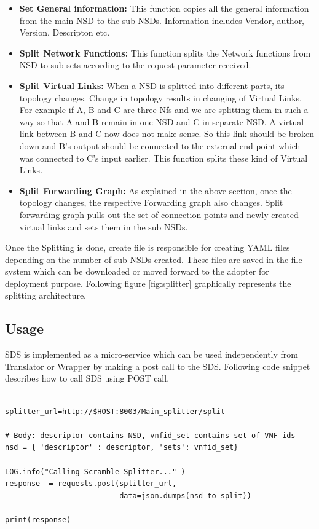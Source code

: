 \begin{itemize}
	\item \textbf{Set General information: }This function copies all the general information from the main NSD to the sub NSDs. Information includes Vendor, author, Version, Descripton etc.
	\item \textbf{Split Network Functions: }This function splits the Network functions from NSD to sub sets according to the request parameter received. 
	\item \textbf{Split Virtual Links: }When a NSD is splitted into different parts, its topology changes. Change in topology results in changing of Virtual Links. For example if A, B and C are three Nfs and we are splitting them in such a way so that A and B remain in one NSD and C in separate NSD. A virtual link between B and C now does not make sense. So this link should be broken down and B’s output should be connected to the external end point which was connected to C’s input earlier. This function splits these kind of Virtual Links.
	\item \textbf{Split Forwarding Graph: }As explained in the above section, once the topology changes, the respective Forwarding graph also changes. Split forwarding graph pulls out the set of connection points and newly created virtual links and sets them in the sub NSDs.
\end{itemize} 

Once the Splitting is done, create file is responsible for creating YAML files depending on the number of sub NSDs created. These files are saved in the file system which can be downloaded or moved forward to the adopter for deployment purpose. Following figure \ref{fig:splitter} graphically represents the splitting architecture.



\subsection{Usage}

SDS is implemented as a micro-service which can be used independently from Translator or Wrapper by making a post call to the SDS. Following code snippet describes how to call SDS using POST call.

\begin{lstlisting}[caption=POST call to SDS, label=lis:postSDS]

splitter_url=http://$HOST:8003/Main_splitter/split

# Body: descriptor contains NSD, vnfid_set contains set of VNF ids
nsd = { 'descriptor' : descriptor, 'sets': vnfid_set}

LOG.info("Calling Scramble Splitter..." )
response  = requests.post(splitter_url,
                          data=json.dumps(nsd_to_split))

print(response)

\end{lstlisting}


